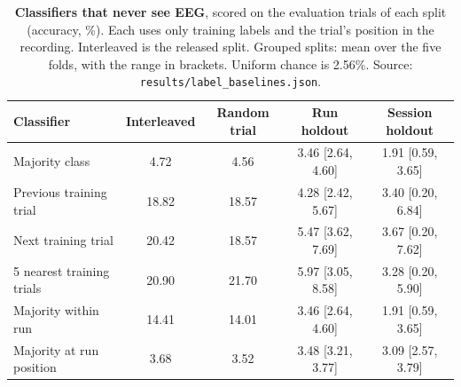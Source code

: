 \begin{table}[t]
\centering
\small
\caption{\textbf{Classifiers that never see EEG}, scored on the evaluation trials of each split (accuracy, \%). Each uses only training labels and the trial's position in the recording. Interleaved is the released split. Grouped splits: mean over the five folds, with the range in brackets. Uniform chance is 2.56\%. Source: \texttt{results/label\_baselines.json}.}
\label{tab:noeeg}
\setlength{\tabcolsep}{4pt}
\begin{tabular}{lcccc}
\toprule
Classifier & Interleaved & Random trial & Run holdout & Session holdout \\
\midrule
Majority class & 4.72 & 4.56 & 3.46 [2.64, 4.60] & 1.91 [0.59, 3.65] \\
Previous training trial & 18.82 & 18.57 & 4.28 [2.42, 5.67] & 3.40 [0.20, 6.84] \\
Next training trial & 20.42 & 18.57 & 5.47 [3.62, 7.69] & 3.67 [0.20, 7.62] \\
5 nearest training trials & 20.90 & 21.70 & 5.97 [3.05, 8.58] & 3.28 [0.20, 5.90] \\
Majority within run & 14.41 & 14.01 & 3.46 [2.64, 4.60] & 1.91 [0.59, 3.65] \\
Majority at run position & 3.68 & 3.52 & 3.48 [3.21, 3.77] & 3.09 [2.57, 3.79] \\
\bottomrule
\end{tabular}
\end{table}
